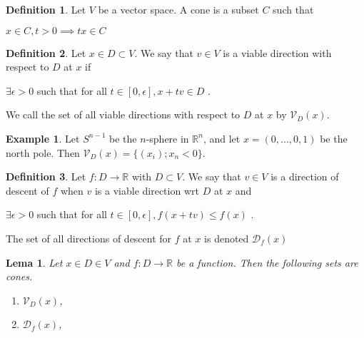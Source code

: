 \documentclass[]{article}
\newtheorem{lemma}{Lema}[section]
\theoremstyle{definition}
\newtheorem{definition}{Definition}[section]
\theoremstyle{definition}
\newtheorem{exmp}{Example}[section]
\newcommand{\raw}{\rightarrow}
\newcommand{\bb}{\mathbb}
\begin{document}
		\begin{definition}
			Let $V$ be a vector space. A cone is a subset $C$ such that 
			
			\begin{center}
				$x \in C, t > 0 \implies tx \in C$ 
			\end{center}
			
		\end{definition}
	
		\begin{definition}
			Let $x \in D \subset V$. We say that $v \in V$ is a viable direction with respect to $D$ at $x$ if 
			
			\begin{center}
				$\exists \epsilon > 0$ such that for all $t \in [0, \epsilon], x + tv \in D$ .
			\end{center}
		
			We call the set of all viable directions with respect to $D$ at $x$ by $\mathcal{V}_D(x) $.  
		\end{definition}
	
		\begin{exmp}
			Let $S^{n-1}$ be the $n$-sphere in $\bb{R}^{n}$, and let $x = (0, ..., 0, 1)$ be the north pole. Then $\mathcal{V}_D(x) = \{ (x_i);  x_{n} < 0  \}$.
		\end{exmp}
		
		\begin{definition}
			Let $f: D \raw \bb{R}$ with $ D \subset V $. We say that $v \in V$ is a direction of descent of $f$ when $v$ is a viable 
			direction wrt $D$ at $x$ and 
			
			\begin{center}
				$\exists \epsilon > 0$ such that for all $t \in [0, \epsilon], f(x + tv) \leq f(x)$ .
			\end{center}
			
			The set of all directions of descent for $f$ at $x$ is denoted $\mathcal{D}_f(x)$
		\end{definition}
	
		\begin{lemma}
			Let $x \in D \in V$ and $ f: D \raw \bb{R} $ be a function. Then the following sets are cones.
			
			\begin{enumerate}
				\item $\mathcal{V}_D(x)$,
			 	
				\item $ \mathcal{D}_f(x) $,
			\end{enumerate}
		\end{lemma}
	
\end{document}
